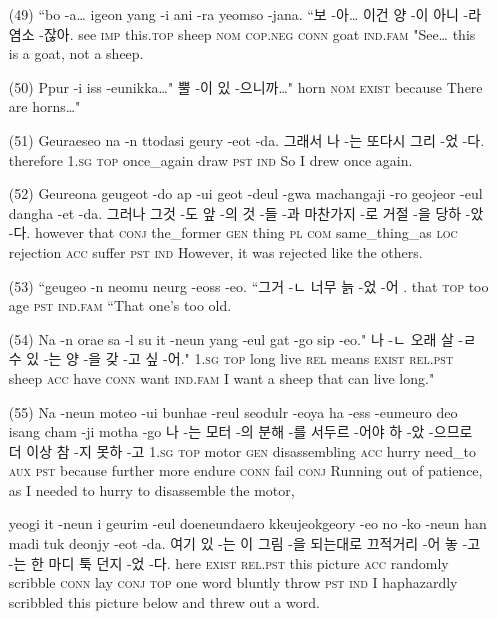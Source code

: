 \begin{itemize}
\item [(49)]
\tgl
		{``bo -a… igeon yang -i ani -ra yeomso -jana.}
		{``보 -아… 이건 양 -이 아니 -라 염소 -잖아.}
		{see	\textsc{imp}	this.\textsc{top}	sheep	\textsc{nom}	\textsc{cop.neg}	\textsc{conn}	goat	\textsc{ind.fam}}
		{"See… this is a goat, not a sheep.}
		
\item [(50)]
\tgl
		{Ppur -i iss -eunikka…"}
		{뿔 -이 있 -으니까…"}
		{horn	\textsc{nom}	\textsc{exist}	because}
		{There are horns…"}
		
\item [(51)]
\tgl
		{Geuraeseo na -n ttodasi geury -eot -da.}
		{그래서 나 -는 또다시 그리 -었 -다.}
		{therefore	\textsc{1.sg}	\textsc{top}	once\_again	draw	\textsc{pst}	\textsc{ind}}
		{So I drew once again.}
		
\item [(52)]
\tgl
		{Geureona geugeot -do ap -ui geot -deul -gwa machangaji -ro geojeor -eul dangha -et -da.}
		{그러나 그것 -도 앞 -의 것 -들 -과 마찬가지 -로 거절 -을 당하 -았 -다.}
		{however	that	\textsc{conj}	the\_former	\textsc{gen}	thing	\textsc{pl}	\textsc{com}	same\_thing\_as	\textsc{loc}	rejection	\textsc{acc}	suffer	\textsc{pst}	\textsc{ind}}
		{However, it was rejected like the others.}

\item [(53)]
\tgl
		{``geugeo -n neomu neurg -eoss -eo.}
		{``그거 -ㄴ 너무 늙 -었 -어 .}
		{that	\textsc{top}	too	age	\textsc{pst}	\textsc{ind.fam}}
		{``That one's too old.}
		
\item [(54)]
\tgl
		{Na -n orae sa -l su it -neun yang -eul gat -go sip -eo."}
		{나 -ㄴ 오래 살 -ㄹ 수 있 -는 양 -을 갖 -고 싶 -어."}
		{\textsc{1.sg}	\textsc{top}	long	live	\textsc{rel}	means	\textsc{exist}	\textsc{rel.pst}	sheep	\textsc{acc}	have	\textsc{conn}	want	\textsc{ind.fam}}
		{I want a sheep that can live long."}

\item [(55)]
\tgl
		{Na -neun moteo -ui bunhae -reul seodulr -eoya ha -ess -eumeuro deo isang cham -ji motha -go}
		{나 -는 모터 -의 분해 -를 서두르 -어야 하 -았 -으므로 더 이상 참 -지 못하 -고}
		{\textsc{1.sg}	\textsc{top}	motor	\textsc{gen}	disassembling	\textsc{acc}	hurry	need\_to	\textsc{aux}	\textsc{pst}	because	further	more	endure	\textsc{conn}	fail	\textsc{conj}}
		{Running out of patience, as I needed to hurry to disassemble the motor,}

\tgl
		{yeogi it -neun i geurim -eul doeneundaero kkeujeokgeory -eo no -ko -neun han madi tuk deonjy -eot -da.}
		{여기 있 -는 이 그림 -을 되는대로 끄적거리 -어 놓 -고 -는 한 마디 툭 던지 -었 -다.}
		{here	\textsc{exist}	\textsc{rel.pst}	this	picture	\textsc{acc}	randomly	scribble	\textsc{conn}	lay	\textsc{conj}	\textsc{top}	one	word	bluntly	throw	\textsc{pst}	\textsc{ind}}
		{I haphazardly scribbled this picture below and threw out a word.}
		

\end{itemize}
